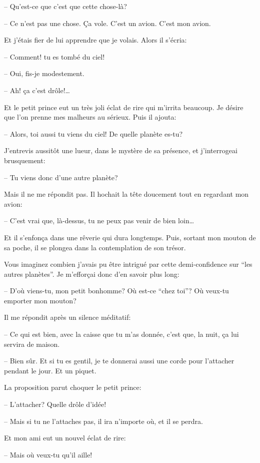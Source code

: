 \begin{Parallel}[p]{}{}
{-- Qu'est-ce que c'est que cette chose-là?

-- Ce n'est pas une chose. Ça vole. C'est un avion. C'est mon avion.
 
Et j’étais fier de lui apprendre que je volais. Alors il
s'écria:

-- Comment! tu es tombé du ciel!

-- Oui, fis-je modestement.

-- Ah! ça c'est drôle!\ldots{}

Et le petit prince eut un très joli éclat de rire qui
m'irrita beaucoup. Je désire que l'on prenne mes
malheurs au sérieux. Puis il ajouta:

-- Alors, toi aussi tu viens du ciel! De quelle planète es-tu?

J'entrevis aussitôt une lueur, dans le mystère de sa
présence, et j'interrogeai brusquement:

-- Tu viens donc d'une autre planète?

Mais il ne me répondit pas. Il hochait la tête doucement tout en regardant mon avion:

-- C'est vrai que, là-dessus, tu ne peux pas venir de
bien loin\ldots{}

Et il s'enfonça dans une rêverie qui dura longtemps. Puis, sortant mon mouton de sa poche, il se
plongea dans la contemplation de son trésor.

\medskip

Vous imaginez combien j'avais pu être intrigué
par cette demi-confidence sur ``les autres planètes''.
Je m'efforçai donc d'en savoir plus long:

-- D'où viens-tu, mon petit bonhomme? Où est-ce
``chez toi''? Où veux-tu emporter mon mouton?

Il me répondit après un silence méditatif:

-- Ce qui est bien, avec la caisse que tu m'as donnée, c'est que, la nuit, ça lui servira de maison.

-- Bien sûr. Et si tu es gentil, je te donnerai aussi
une corde pour l'attacher pendant le jour. Et un
piquet.

La proposition parut choquer le petit prince:

-- L'attacher? Quelle drôle d'idée!

-- Mais si tu ne l'attaches pas, il ira n'importe où,
et il se perdra.

Et mon ami eut un nouvel éclat de rire:

-- Mais où veux-tu qu'il aille!

}
\end{Parallel}
